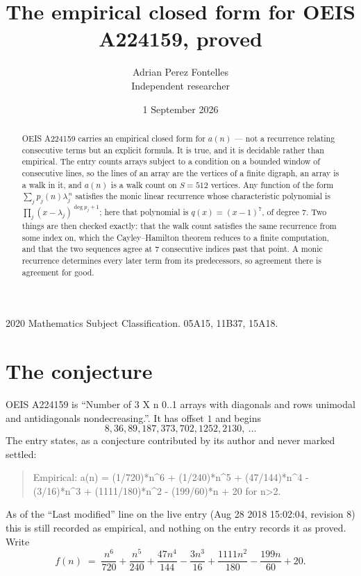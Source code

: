 \documentclass[11pt,a4paper]{article}
\title{The empirical closed form for OEIS A224159, proved}
\author{Adrian Perez Fontelles\\ \small Independent researcher}
\date{1 September 2026}
\theoremstyle{plain}
\theoremstyle{definition}
\begin{document}
\maketitle

\begin{abstract}
OEIS A224159 carries an empirical closed form for $a(n)$ --- not a recurrence relating
consecutive terms but an explicit formula. It is true, and it is decidable rather than
empirical. The entry counts arrays subject to a condition on a bounded window of consecutive lines, so the lines of an array are the
vertices of a finite digraph, an array is a walk in it, and $a(n)$ is a walk count on
$S=512$ vertices. Any function of the form $\sum_j p_j(n)\lambda_j^{\,n}$ satisfies the
monic linear recurrence whose characteristic polynomial is
$\prod_j(x-\lambda_j)^{\deg p_j+1}$; here that polynomial is $q(x)=(x-1)^{7}$, of degree
$7$. Two things are then checked exactly: that the walk count satisfies the same
recurrence from some index on, which the Cayley--Hamilton theorem reduces to a finite
computation, and that the two sequences agree at $7$ consecutive indices past that
point. A monic recurrence determines every later term from its predecessors, so agreement
there is agreement for good.
\end{abstract}

\noindent\small 2020 Mathematics Subject Classification. 05A15, 11B37, 15A18.\normalsize

\section{The conjecture}

OEIS A224159 is ``Number of 3 X n 0..1 arrays with diagonals and rows unimodal and antidiagonals nondecreasing.''. It has offset $1$ and begins
\[
8, 36, 89, 187, 373, 702, 1252, 2130,\ \dots
\]
The entry states, as a conjecture contributed by its author and never marked settled:
\begin{quote}
Empirical: a(n) = (1/720)*n\^{}6 + (1/240)*n\^{}5 + (47/144)*n\^{}4 - (3/16)*n\^{}3 + (1111/180)*n\^{}2 - (199/60)*n + 20 for n>2.
\end{quote}
As of the ``Last modified'' line on the live entry (Aug 28 2018 15:02:04, revision 8) this is still
recorded as empirical, and nothing on the entry records it as proved. Write
\[
f(n)\;=\;\frac{n^{6}}{720} + \frac{n^{5}}{240} + \frac{47 n^{4}}{144} - \frac{3 n^{3}}{16} + \frac{1111 n^{2}}{180} - \frac{199 n}{60} + 20.
\]
\end{document}
